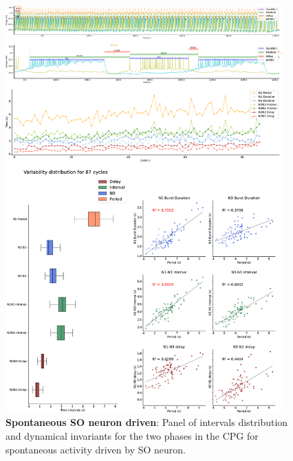 \begin{figure}[htbp]
	\centering
	\includegraphics[width=0.95\textwidth]{./img/invariants/data/SUSSEX/prep4_so_driven_2/images/panel_with_intervals.pdf}
	\caption{\textbf{Spontaneous SO neuron driven}: Panel of intervals distribution and dynamical invariants for the two phases in the CPG for spontaneous activity driven by SO neuron.}
	\label{fig:so spontaneous invariants 2}
\end{figure}


